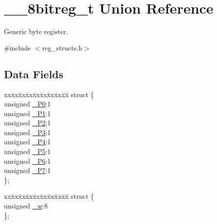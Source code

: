 \hypertarget{union____8bitreg__t}{\section{\-\_\-\-\_\-8bitreg\-\_\-t Union Reference}
\label{union____8bitreg__t}
}


Generic byte register.  




{\ttfamily \#include $<$reg\-\_\-structs.\-h$>$}

\subsection*{Data Fields}
\begin{DoxyCompactItemize}
\item 
\begin{tabbing}
xx\=xx\=xx\=xx\=xx\=xx\=xx\=xx\=xx\=\kill
struct \{\\
\>unsigned \hyperlink{union____8bitreg__t_a1c9e01d434d8eb4c6a45b76dd4f1175f}{\_P0}:1\\
\>unsigned \hyperlink{union____8bitreg__t_a108c964a03f1123681899156b636e203}{\_P1}:1\\
\>unsigned \hyperlink{union____8bitreg__t_a30b9937367ef01f1adc9f4353c9c323e}{\_P2}:1\\
\>unsigned \hyperlink{union____8bitreg__t_a5d21a8af52e9e72f540bc6032d7c1047}{\_P3}:1\\
\>unsigned \hyperlink{union____8bitreg__t_a8e1225a088df1088350fd78a57fa38b4}{\_P4}:1\\
\>unsigned \hyperlink{union____8bitreg__t_a4a51fd205ff67d3523e92697adc2fc86}{\_P5}:1\\
\>unsigned \hyperlink{union____8bitreg__t_aa3a7604eeb889d347ef856be027dc6ba}{\_P6}:1\\
\>unsigned \hyperlink{union____8bitreg__t_aae126f699a2181048e367daeaa2abc3f}{\_P7}:1\\
\}; \\

\end{tabbing}\item 
\begin{tabbing}
xx\=xx\=xx\=xx\=xx\=xx\=xx\=xx\=xx\=\kill
struct \{\\
\>unsigned \hyperlink{union____8bitreg__t_ae67d36d5dda8021c96460fd7157055cb}{\_w}:8\\
\}; \\

\end{tabbing}\end{DoxyCompactItemize}


